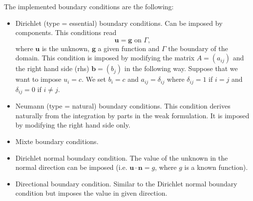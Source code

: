 \documentclass[11pt]{article}
\begin{document}
The implemented boundary conditions are the following:
\begin{itemize}
\item Dirichlet (type = essential) boundary conditions. Can be imposed by components. This conditions read
\begin{equation}
\mathbf{u} = \mathbf{g} \text{ on }\Gamma,
\end{equation}
where $\mathbf{u}$ is the unknown, $\mathbf{g}$ a given function and $\Gamma$ the boundary of the domain. This condition is imposed by modifying the matrix $A=(a_{ij})$ and the right hand side (rhs) $\mathbf{b}=(b_j)$ in the following way. Suppose that we want to impose $u_i=c$. We set $b_i=c$ and $a_{ij}=\delta_{ij}$ where $\delta_{ij}=1$ if $i=j$ and $\delta_{ij}=0$ if $i\neq j$.
\item Neumann (type = natural) boundary conditions. This condition derives naturally from the integration by parts in the weak formulation. It is imposed by modifying the right hand side only.
\item Mixte boundary conditions.
\item Dirichlet normal boundary condition. The value of the unknown in the normal direction can be imposed (i.e. $\mathbf{u}\cdot\mathbf{n}=g$, where $g$ is a known function).
\item Directional boundary condition. Similar to the Dirichlet normal boundary condition but imposes the value in given direction.
\end{itemize}

\end{document}
